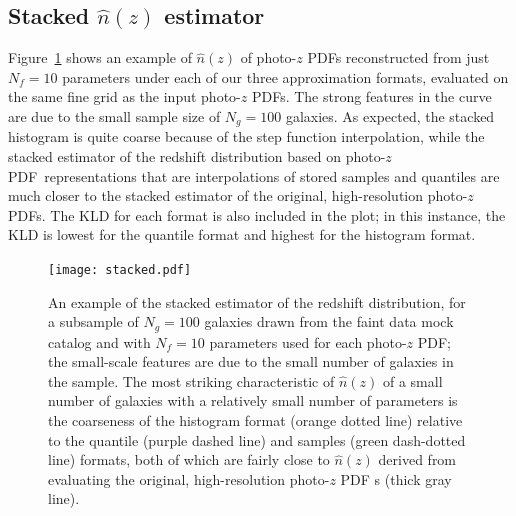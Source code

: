 \documentclass[\docopts]{\docclass}
\newcommand{\pz}{photo-$z$ PDF}
\newcommand{\ssdata}{faint\xspace}
\begin{document}
\subsection{Stacked $\hat{n}(z)$ estimator}
\label{sec:stacked_results}

Figure~\ref{fig:stacked} shows an example of $\hat{n}(z)$ of \pz s 
reconstructed from just $N_{f}=10$ parameters under each of our three 
approximation formats, evaluated on the same fine grid as the input \pz s.
The strong features in the curve are due to the small sample size of 
$N_{g}=100$ galaxies.
As expected, the stacked histogram is quite coarse because of the step function 
interpolation, while the stacked estimator of the redshift distribution based 
on \pz\ representations that are interpolations of stored samples and quantiles 
are much closer to the stacked estimator of the original, high-resolution \pz s.
The KLD for each format is also included in the plot; in this instance, the KLD 
is lowest for the quantile format and highest for the histogram format.

\begin{figure}
  \begin{center}
    \texttt{[image: stacked.pdf]}
    \caption{An example of the stacked estimator of the redshift distribution, 
for a subsample of $N_{g}=100$ galaxies drawn from the \ssdata data mock 
catalog and with $N_{f}=10$ parameters used for each \pz; the small-scale 
features are due to the small number of galaxies in the sample.
    The most striking characteristic of $\hat{n}(z)$ of a small number of 
galaxies with a relatively small number of parameters is the coarseness of the 
histogram format (orange dotted line) relative to the quantile (purple dashed 
line) and samples (green dash-dotted line) formats, both of which are fairly 
close to $\hat{n}(z)$ derived from evaluating the original, high-resolution \pz 
s (thick gray line).
    \label{fig:stacked}}
  \end{center}
\end{figure}
\end{document}

